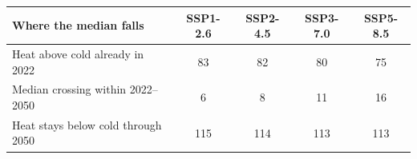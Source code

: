 \begin{tabular}{lcccc}
\toprule
Where the median falls & SSP1-2.6 & SSP2-4.5 & SSP3-7.0 & SSP5-8.5 \\
\midrule
Heat above cold already in 2022 & 83 & 82 & 80 & 75 \\
Median crossing within 2022--2050 & 6 & 8 & 11 & 16 \\
Heat stays below cold through 2050 & 115 & 114 & 113 & 113 \\
\bottomrule
\end{tabular}
